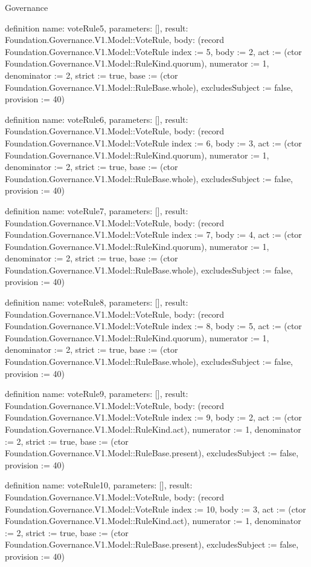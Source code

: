 \begin{lexlean}{Governance}
\begin{semanticmodule}
definition{
  name: voteRule5,
  parameters: [],
  result: Foundation.Governance.V1.Model::VoteRule,
  body: (record Foundation.Governance.V1.Model::VoteRule {index := 5, body := 2, act := (ctor Foundation.Governance.V1.Model::RuleKind.quorum), numerator := 1, denominator := 2, strict := true, base := (ctor Foundation.Governance.V1.Model::RuleBase.whole), excludesSubject := false, provision := 40})
}

definition{
  name: voteRule6,
  parameters: [],
  result: Foundation.Governance.V1.Model::VoteRule,
  body: (record Foundation.Governance.V1.Model::VoteRule {index := 6, body := 3, act := (ctor Foundation.Governance.V1.Model::RuleKind.quorum), numerator := 1, denominator := 2, strict := true, base := (ctor Foundation.Governance.V1.Model::RuleBase.whole), excludesSubject := false, provision := 40})
}

definition{
  name: voteRule7,
  parameters: [],
  result: Foundation.Governance.V1.Model::VoteRule,
  body: (record Foundation.Governance.V1.Model::VoteRule {index := 7, body := 4, act := (ctor Foundation.Governance.V1.Model::RuleKind.quorum), numerator := 1, denominator := 2, strict := true, base := (ctor Foundation.Governance.V1.Model::RuleBase.whole), excludesSubject := false, provision := 40})
}

definition{
  name: voteRule8,
  parameters: [],
  result: Foundation.Governance.V1.Model::VoteRule,
  body: (record Foundation.Governance.V1.Model::VoteRule {index := 8, body := 5, act := (ctor Foundation.Governance.V1.Model::RuleKind.quorum), numerator := 1, denominator := 2, strict := true, base := (ctor Foundation.Governance.V1.Model::RuleBase.whole), excludesSubject := false, provision := 40})
}

definition{
  name: voteRule9,
  parameters: [],
  result: Foundation.Governance.V1.Model::VoteRule,
  body: (record Foundation.Governance.V1.Model::VoteRule {index := 9, body := 2, act := (ctor Foundation.Governance.V1.Model::RuleKind.act), numerator := 1, denominator := 2, strict := true, base := (ctor Foundation.Governance.V1.Model::RuleBase.present), excludesSubject := false, provision := 40})
}

definition{
  name: voteRule10,
  parameters: [],
  result: Foundation.Governance.V1.Model::VoteRule,
  body: (record Foundation.Governance.V1.Model::VoteRule {index := 10, body := 3, act := (ctor Foundation.Governance.V1.Model::RuleKind.act), numerator := 1, denominator := 2, strict := true, base := (ctor Foundation.Governance.V1.Model::RuleBase.present), excludesSubject := false, provision := 40})
}


\end{semanticmodule}
\end{lexlean}
